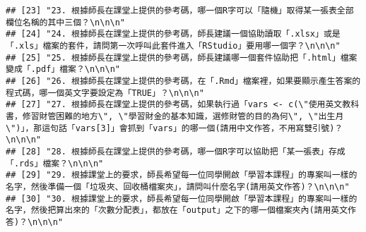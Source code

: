 \documentclass[
]{article}
\begin{document}
\begin{verbatim}
## [23] "23. 根據師長在課堂上提供的參考碼，哪一個R字可以「隨機」取得某一張表全部欄位名稱的其中三個？\n\n\n"                                                                                                                                       
## [24] "24. 根據師長在課堂上提供的參考碼，師長建議一個協助讀取「.xlsx」或是「.xls」檔案的套件，請問第一次呼叫此套件進入「RStudio」要用哪一個字？\n\n\n"                                                                                          
## [25] "25. 根據師長在課堂上提供的參考碼，師長建議哪一個套件協助把「.html」檔案變成「.pdf」檔案？\n\n\n"                                                                                                                                         
## [26] "26. 根據師長在課堂上提供的參考碼，在「.Rmd」檔案裡，如果要顯示產生答案的程式碼，哪一個英文字要設定為「TRUE」？\n\n\n"                                                                                                                    
## [27] "27. 根據師長在課堂上提供的參考碼，如果執行過「vars <- c(\"使用英文教科書，修習財管困難的地方\", \"學習財金的基本知識，選修財管的目的為何\", \"出生月\")」，那這句話「vars[3]」會抓到「vars」的哪一個(請用中文作答，不用寫雙引號)？\n\n\n"
## [28] "28. 根據師長在課堂上提供的參考碼，哪一個R字可以協助把「某一張表」存成「.rds」檔案？\n\n\n"                                                                                                                                               
## [29] "29. 根據課堂上的要求，師長希望每一位同學開啟「學習本課程」的專案叫一樣的名字，然後準備一個「垃圾夾、回收桶檔案夾」，請問叫什麼名字(請用英文作答)？\n\n\n"                                                                                
## [30] "30. 根據課堂上的要求，師長希望每一位同學開啟「學習本課程」的專案叫一樣的名字，然後把算出來的「次數分配表」，都放在「output」之下的哪一個檔案夾內(請用英文作答)？\n\n\n"
\end{verbatim}
\end{document}

